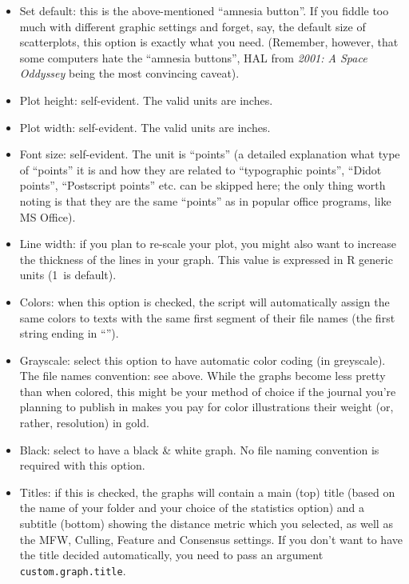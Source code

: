 \documentclass[11pt,a4paper]{article}
\def\underscore{\raisebox{-.8ex}{-}}
\def\margin#1{\marginpar{\textcolor{blue}{\footnotesize\tt #1}}}
\def\code#1{{\tt #1}}
\begin{document}
\begin{itemize}
\item Set default: this is the above-mentioned ``amnesia button''.\margin{plot.options.reset=}\margin{TRUE|FALSE}
If you fiddle too much with different graphic settings and forget,
say, the default size of scatterplots, this option is exactly what
you need. (Remember, however, that some computers hate the ``amnesia
buttons'', HAL from \emph{2001: A Space Oddyssey} being the most convincing
caveat). 

\item Plot height: self-evident. The valid units are inches.\margin{plot.custom.height=} 

\item Plot width: self-evident. The valid units are inches.\margin{plot.custom.width=} 

\item Font size: self-evident.\margin{plot.font.size=}\margin{<integer>}
The unit is ``points'' (a detailed explanation what type of ``points''
it is and how they are related to ``typographic points'', ``Didot points'',
``Postscript points'' etc. can be skipped here; the only thing worth
noting is that they are the same ``points'' as in popular office programs,
like MS Office). 

\item Line width:\margin{plot.line.thickness=}\margin{<integer>} if
you plan to re-scale your plot, you might also want to increase the
thickness of the lines in your graph. This value is expressed in R
generic units (1~is default). 

\item Colors:\margin{colors.on.graphs=}\margin{"colors"}
when this option is checked, the script will automatically assign
the same colors to texts with the same first segment of their file
names (the first string ending in ``{}\code{\underscore}''). 

\item Grayscale:\margin{"grayscale"} select
this option to have automatic color coding (in greyscale). The file
names convention: see above. While the graphs become less pretty than
when colored, this might be your method of choice if the journal you're
planning to publish in makes you pay for color illustrations their
weight (or, rather, resolution) in gold.

\item Black:\margin{"black"} select to have
a black \& white graph. No file naming convention is required with this option. 

\item Titles:\margin{titles.on.graphs=}\margin{TRUE|FALSE} if this
is checked, the graphs will contain a main (top) title (based on the
name of your folder and your choice of the statistics option) and
a subtitle (bottom) showing the distance metric which you selected,
as well as the MFW, Culling, Feature and Consensus settings.%
\margin{custom.graph.title=}\margin{"Any text"}
If you don't want to have the title decided automatically, you need to 
pass an argument \code{custom.graph.title}.
\end{itemize}
\end{document}
